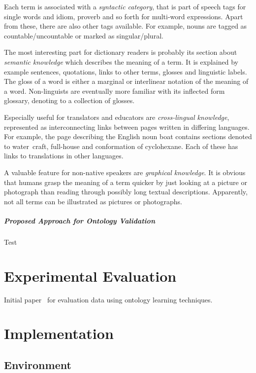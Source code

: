 \documentclass[draft,final]{vutinfth} %
\begin{document}
Each term is associated with a \textit{syntactic category}, that is part of speech tags for single words and idiom, proverb and so forth for multi-word expressions. Apart from these, there are also other tags available. For example, nouns are tagged as countable/uncountable or marked as singular/plural. 

The most interesting part for dictionary readers is probably its section about \textit{semantic knowledge} which describes the meaning of a term. It is explained by example sentences, quotations, links to other terms, glosses and linguistic labels. The gloss of a word is either a marginal or interlinear notation of the meaning of a word. Non-linguists are eventually more familiar with its inflected form glossary, denoting to a collection of glosses. 

Especially useful for translators and educators are \textit{cross-lingual knowledge}, represented as interconnecting links between pages written in differing languages. For example, the page describing the English noun boat contains sections denoted to water~craft, full-house and conformation of cyclohexane. Each of these has links to translations in other languages. 

A valuable feature for non-native speakers are \emph{graphical knowledge}. It is obvious that humans grasp the meaning of a term quicker by just looking at a picture or photograph than reading through possibly long textual descriptions. Apparently, not all terms can be illustrated as pictures or photographs. 

\paragraph{Proposed Approach for Ontology Validation} Test



\chapter{Experimental Evaluation}
Initial paper~\cite{liu2005semi} for evaluation data using ontology learning techniques.


\chapter{Implementation}\label{chap:implementation}
\section{Environment}
\end{document}
